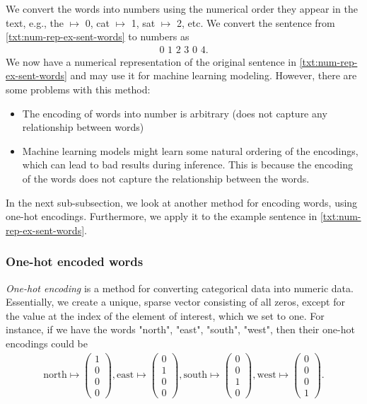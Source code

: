 We convert the words into numbers using the numerical order they appear in the text, e.g., the $\mapsto$ 0, cat $\mapsto$ 1, sat $\mapsto$ 2, etc. We convert the sentence from \cref{txt:num-rep-ex-sent-words} to numbers as
\begin{align}
    \text{0 1 2 3 0 4}
    \label{txt:num-rep-ex-sent}.
\end{align}
We now have a numerical representation of the original sentence in \cref{txt:num-rep-ex-sent-words} and may use it for machine learning modeling. However, there are some problems with this method:
\begin{itemize}
    \item The encoding of words into number is arbitrary (does not capture any relationship between words)
    \item Machine learning models might learn some natural ordering of the encodings, which can lead to bad results during inference. This is because the encoding of the words does not capture the relationship between the words.
\end{itemize}

In the next sub-subsection, we look at another method for encoding words, using one-hot encodings. Furthermore, we apply it to the example sentence in \cref{txt:num-rep-ex-sent-words}.

\subsubsection{One-hot encoded words}
\textit{One-hot encoding} is a method for converting categorical data into numeric data. Essentially, we create a unique, sparse vector consisting of all zeros, except for the value at the index of the element of interest, which we set to one. For instance, if we have the words "north", "east", "south", "west", then their one-hot encodings could be
\begin{align}
    \text{north} \mapsto \begin{pmatrix}
    1\\
    0\\
    0\\
    0
    \end{pmatrix},
    \text{east} \mapsto \begin{pmatrix}
    0\\
    1\\
    0\\
    0
    \end{pmatrix},
    \text{south} \mapsto \begin{pmatrix}
    0\\
    0\\
    1\\
    0
    \end{pmatrix},
    \text{west} \mapsto \begin{pmatrix}
    0\\
    0\\
    0\\
    1
    \end{pmatrix}.
\end{align}

